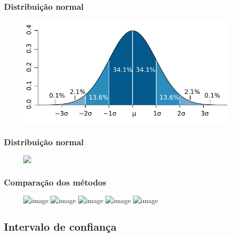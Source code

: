 \documentclass[xcolor=dvipsnames]{beamer}
\begin{document}
\begin{frame}%
\frametitle{Distribuição normal}

\begin{figure}
\centering
\includegraphics[scale=1]{img/Standard_deviation_diagram.pdf}
\end{figure}

\end{frame}%

\begin{frame}%
\frametitle{Distribuição normal}

\begin{figure}
\centering
\includegraphics<1>[scale=0.5]{img/densidade_media}
\end{figure}

\end{frame}%

\begin{frame}%
\frametitle{Comparação dos métodos}

\begin{figure}
\centering
\includegraphics<1>[scale=0.5]{img/densidade_n1}
\includegraphics<2>[scale=0.5]{img/densidade_n2}
\includegraphics<3>[scale=0.5]{img/densidade_n3}
\includegraphics<4>[scale=0.5]{img/densidade_n4}
\includegraphics<5>[scale=0.5]{img/densidade_n5}
\end{figure}

\end{frame}%

\subsection{Intervalo de confiança}
\end{document}
